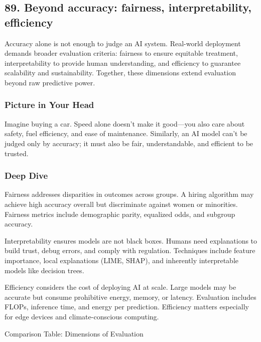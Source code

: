 \documentclass[
  letterpaper,
  DIV=11,
  numbers=noendperiod]{scrreprt}
\begin{document}
\subsection{89. Beyond accuracy: fairness, interpretability,
efficiency}\label{beyond-accuracy-fairness-interpretability-efficiency}

Accuracy alone is not enough to judge an AI system. Real-world
deployment demands broader evaluation criteria: fairness to ensure
equitable treatment, interpretability to provide human understanding,
and efficiency to guarantee scalability and sustainability. Together,
these dimensions extend evaluation beyond raw predictive power.

\subsubsection{Picture in Your Head}\label{picture-in-your-head-88}

Imagine buying a car. Speed alone doesn't make it good---you also care
about safety, fuel efficiency, and ease of maintenance. Similarly, an AI
model can't be judged only by accuracy; it must also be fair,
understandable, and efficient to be trusted.

\subsubsection{Deep Dive}\label{deep-dive-88}

Fairness addresses disparities in outcomes across groups. A hiring
algorithm may achieve high accuracy overall but discriminate against
women or minorities. Fairness metrics include demographic parity,
equalized odds, and subgroup accuracy.

Interpretability ensures models are not black boxes. Humans need
explanations to build trust, debug errors, and comply with regulation.
Techniques include feature importance, local explanations (LIME, SHAP),
and inherently interpretable models like decision trees.

Efficiency considers the cost of deploying AI at scale. Large models may
be accurate but consume prohibitive energy, memory, or latency.
Evaluation includes FLOPs, inference time, and energy per prediction.
Efficiency matters especially for edge devices and climate-conscious
computing.

Comparison Table: Dimensions of Evaluation
\end{document}
